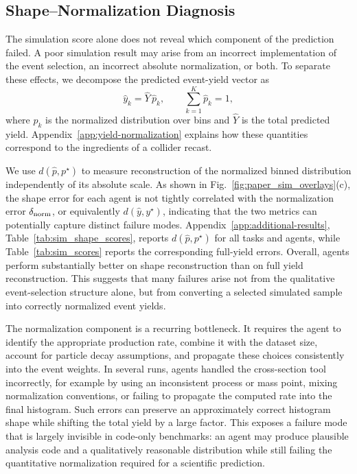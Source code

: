 \documentclass{article}
\begin{document}
\subsection{Shape--Normalization Diagnosis}
\label{sec:shape-normalization}

The simulation score alone does not reveal which component of the prediction failed. A poor simulation result may arise from an incorrect implementation of the event selection, an incorrect absolute normalization, or both. To separate these effects, we decompose the predicted event-yield vector as
\begin{equation}
    \hat{y}_k = \hat{Y}\,\hat{p}_k,
    \qquad
    \sum_{k=1}^K \hat{p}_k = 1,
\end{equation}
where \(\hat{p}_k\) is the normalized distribution over bins and \(\hat{Y}\) is the total predicted yield. Appendix~\ref{app:yield-normalization} explains how these quantities correspond to the ingredients of a collider recast.

We use \(d(\hat p,p^\star)\) to measure reconstruction of the normalized binned distribution independently of its absolute scale. As shown in Fig.~\ref{fig:paper_sim_overlays}(c), the shape error for each agent is not tightly correlated with the normalization error \(\delta_{\rm norm}\), or equivalently \(d(\hat y,y^\star)\), indicating that the two metrics can potentially capture distinct failure modes. Appendix~\ref{app:additional-results}, Table~\ref{tab:sim_shape_scores}, reports \(d(\hat p,p^\star)\) for all tasks and agents, while Table~\ref{tab:sim_scores} reports the corresponding full-yield errors. Overall, agents perform substantially better on shape reconstruction than on full yield reconstruction. This suggests that many failures arise not from the qualitative event-selection structure alone, but from converting a selected simulated sample into correctly normalized event yields.

The normalization component is a recurring bottleneck. It requires the agent to identify the appropriate production rate, combine it with the dataset size, account for particle decay assumptions, and propagate these choices consistently into the event weights. In several runs, agents handled the cross-section tool incorrectly, for example by using an inconsistent process or mass point, mixing normalization conventions, or failing to propagate the computed rate into the final histogram. Such errors can preserve an approximately correct histogram shape while shifting the total yield by a large factor. This exposes a failure mode that is largely invisible in code-only benchmarks: an agent may produce plausible analysis code and a qualitatively reasonable distribution while still failing the quantitative normalization required for a scientific prediction.
\end{document}
